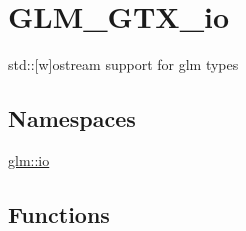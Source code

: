 \hypertarget{group__gtx__io}{}\section{G\+L\+M\+\_\+\+G\+T\+X\+\_\+io}
\label{group__gtx__io}


std\+:\+:\mbox{[}w\mbox{]}ostream support for glm types  


\subsection*{Namespaces}
\begin{DoxyCompactItemize}
\item 
 \mbox{\hyperlink{namespaceglm_1_1io}{glm\+::io}}
\end{DoxyCompactItemize}
\subsection*{Functions}
